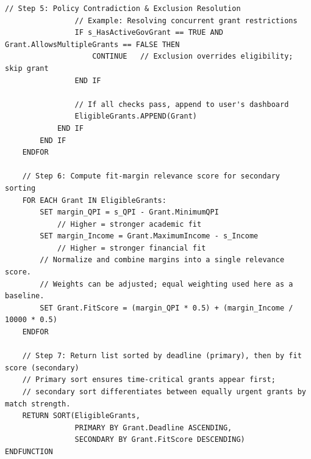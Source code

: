 \begin{lstlisting}[caption={Pseudocode of the Smart Eligibility Checker matching algorithm},label={lst:matching}]
                // Step 5: Policy Contradiction & Exclusion Resolution
                // Example: Resolving concurrent grant restrictions
                IF s_HasActiveGovGrant == TRUE AND Grant.AllowsMultipleGrants == FALSE THEN
                    CONTINUE   // Exclusion overrides eligibility; skip grant
                END IF

                // If all checks pass, append to user's dashboard
                EligibleGrants.APPEND(Grant)
            END IF
        END IF
    ENDFOR

    // Step 6: Compute fit-margin relevance score for secondary sorting
    FOR EACH Grant IN EligibleGrants:
        SET margin_QPI = s_QPI - Grant.MinimumQPI
            // Higher = stronger academic fit
        SET margin_Income = Grant.MaximumIncome - s_Income
            // Higher = stronger financial fit
        // Normalize and combine margins into a single relevance score.
        // Weights can be adjusted; equal weighting used here as a baseline.
        SET Grant.FitScore = (margin_QPI * 0.5) + (margin_Income / 10000 * 0.5)
    ENDFOR

    // Step 7: Return list sorted by deadline (primary), then by fit score (secondary)
    // Primary sort ensures time-critical grants appear first;
    // secondary sort differentiates between equally urgent grants by match strength.
    RETURN SORT(EligibleGrants,
                PRIMARY BY Grant.Deadline ASCENDING,
                SECONDARY BY Grant.FitScore DESCENDING)
ENDFUNCTION
\end{lstlisting}
